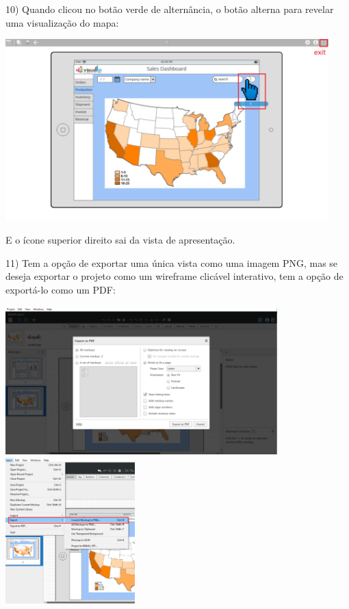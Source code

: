 \documentclass{tufte-book} %
\begin{document}
\break

10) Quando clicou no botão verde de alternância, o botão alterna para revelar uma visualização do mapa:

\begin{center}
	\includegraphics[width=12.50cm]{img22.png}
\end{center}

E o ícone superior direito sai da vista de apresentação.

11) Tem a opção de exportar uma única vista como uma imagem PNG, mas se deseja exportar o projeto como um wireframe clicável interativo, tem a opção de exportá-lo como um PDF:

\begin{center}
	\includegraphics[width=10.50cm]{img23.png}
	\hfill
	\includegraphics[width=5.00cm]{img24.png}
\end{center}
\end{document}
